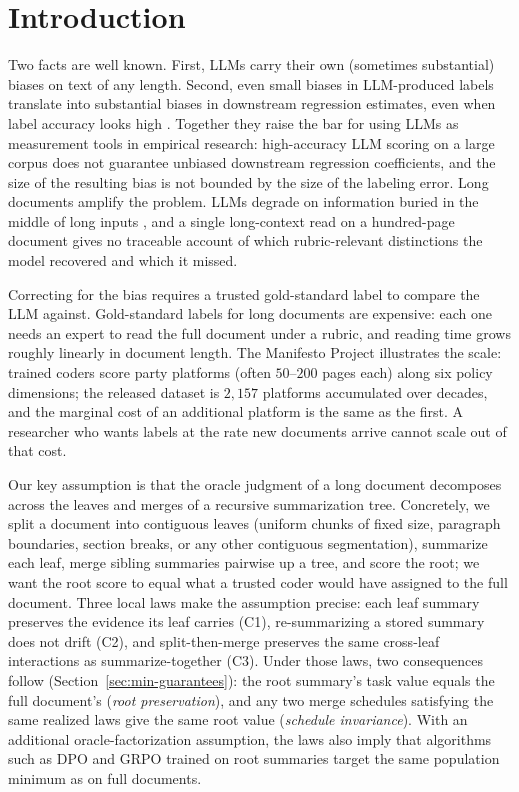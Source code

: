 \section{Introduction}\label{sec:min-introduction}

Two facts are well known. First, LLMs carry their own (sometimes
substantial) biases on text of any length. Second, even small biases in
LLM-produced labels translate into substantial biases in downstream
regression estimates, even when label accuracy looks high
\citep{EgamiEtAl2024}. Together they raise the bar for using LLMs as
measurement tools in empirical research: high-accuracy LLM scoring on a
large corpus does not guarantee unbiased downstream regression
coefficients, and the size of the resulting bias is not bounded by the
size of the labeling error. Long documents amplify the problem. LLMs
degrade on information buried in the middle of long inputs
\citep{LiuEtAl2024LostMiddle}, and a single long-context read on a
hundred-page document gives no traceable account of which
rubric-relevant distinctions the model recovered and which it missed.

Correcting for the bias requires a trusted gold-standard label to
compare the LLM against. Gold-standard labels for long documents are
expensive: each one needs an expert to read the full document under a
rubric, and reading time grows roughly linearly in document length.
The Manifesto Project illustrates the scale: trained coders score
party platforms (often $50$--$200$ pages each) along six policy
dimensions; the released dataset is $2{,}157$ platforms accumulated
over decades, and the marginal cost of an additional platform is the
same as the first. A researcher who wants labels at the rate new
documents arrive cannot scale out of that cost.

Our key assumption is that the oracle judgment of a long document
decomposes across the leaves and merges of a recursive summarization
tree. Concretely, we split a document into contiguous leaves
(uniform chunks of fixed size, paragraph boundaries, section breaks, or
any other contiguous segmentation), summarize each leaf, merge sibling
summaries pairwise up a tree, and score the root; we want the root
score to equal what a trusted coder would have assigned to the full
document. Three local laws make the assumption precise: each leaf
summary preserves the evidence its leaf carries (C1), re-summarizing a
stored summary does not drift (C2), and split-then-merge preserves the
same cross-leaf interactions as summarize-together (C3). Under those laws, two consequences follow
(Section~\ref{sec:min-guarantees}): the root summary's task value
equals the full document's (\emph{root preservation}), and any two
merge schedules satisfying the same realized laws give the same root
value (\emph{schedule invariance}). With an additional
oracle-factorization assumption, the laws also imply that algorithms
such as DPO and GRPO trained on root summaries target the same
population minimum as on full documents.

